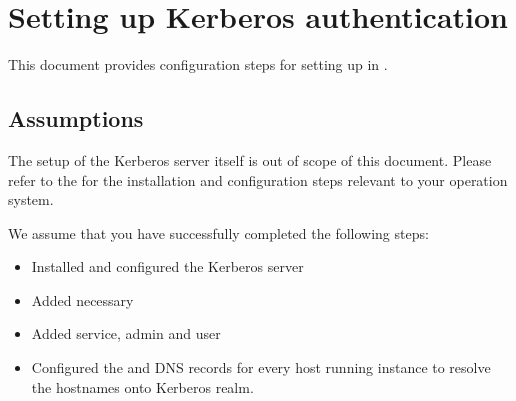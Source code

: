 \documentclass[letterpaper,10pt,english]{sphinxmanual}
\begin{document}
\begin{sphinxVerbatim}[commandchars=\\\{\}]
\PYG{p}{]}
\end{sphinxVerbatim}


\chapter{Setting up Kerberos authentication}
\label{\detokenize{kerberos:setting-up-kerberos-authentication}}\label{\detokenize{kerberos:kerberos}}\label{\detokenize{kerberos::doc}}
\sphinxAtStartPar
This document provides configuration steps for setting up {\hyperref[\detokenize{authentication:kerberos-authentication}]{}} in .


\section{Assumptions}
\label{\detokenize{kerberos:assumptions}}
\sphinxAtStartPar
The setup of the Kerberos server itself is out of scope of this document. Please refer to the  for the installation and configuration steps relevant to your operation system.

\sphinxAtStartPar
We assume that you have successfully completed the following steps:
\begin{itemize}
\item {} 
\sphinxAtStartPar
Installed and configured the Kerberos server

\item {} 
\sphinxAtStartPar
Added necessary 

\item {} 
\sphinxAtStartPar
Added service, admin and user 

\item {} 
\sphinxAtStartPar
Configured the  and  DNS records for every host running  instance to resolve the hostnames onto Kerberos realm.

\end{itemize}
\end{document}
